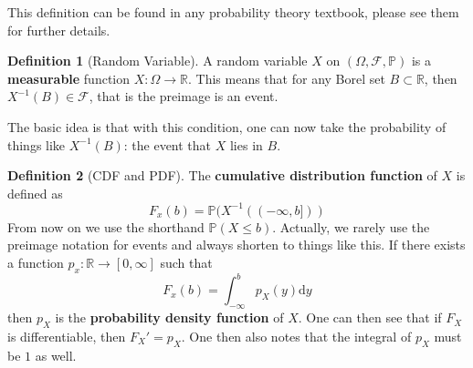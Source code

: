 \documentclass{article}
\numberwithin{equation}{section}
\theoremstyle{definition}
\newtheorem{definition}{Definition}[section]
\newcommand{\R}{\mathbb{R}}
\newcommand{\pr}{\mathbb{P}}
\newcommand{\dm}{\mathrm{d}}
\newcommand{\mc}[1]{\mathcal{#1}}
\newcommand{\pspace}{(\Omega, \mathcal{F}, \mathbb{P})}
\begin{document}
This definition can be found in any probability theory textbook, please see them for further details.
\begin{definition}[Random Variable]
    A random variable $X$ on $\pspace$ is a \textbf{measurable} function $X:\Omega \to \R$. This means that for any Borel set $B \subset \R$, then $X^{-1}(B) \in \mc{F}$, that is the preimage is an event.
\end{definition}
The basic idea is that with this condition, one can now take the probability of things like $X^{-1}(B)$: the event that $X$ lies in $B$.
\begin{definition}[CDF and PDF]
    The \textbf{cumulative distribution function} of $X$ is defined as 
    \begin{equation}
        F_x(b) = \pr(X^{-1}((-\infty, b]))
    \end{equation}
    From now on we use the shorthand $\pr(X \leq b)$. Actually, we rarely use the preimage notation for events and always shorten to things like this.
    If there exists a function $p_x: \R \to [0, \infty]$ such that
    \begin{equation}
        F_x(b) = \int_{-\infty}^b p_X(y) \dm y
    \end{equation}
    then $p_X$ is the \textbf{probability density function} of $X$. One can then see that if $F_X$ is differentiable, then $F_X' = p_X$. One then also notes that the integral of $p_X$ must be $1$ as well.
\end{definition}
\end{document}
